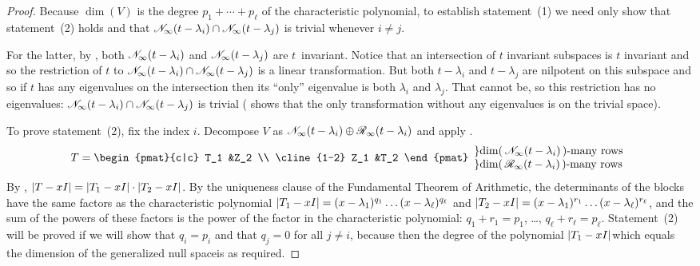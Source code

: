 \begin{proof}
Because \( \dim (V) \) is the degree \( p_1+\cdots+p_\ell \) of the
characteristic polynomial, to establish statement~(1) we need only show that 
statement~(2) holds and that
\( \mathscr{N}_\infty(t-\lambda_i)\cap\mathscr{N}_\infty(t-\lambda_j) \)
is trivial whenever \( i\neq j \).

For the latter, by ,
both \( \mathscr{N}_\infty(t-\lambda_i) \) and 
\( \mathscr{N}_\infty(t-\lambda_j) \) are \( t \)~invariant.
Notice that an intersection of \( t \) invariant subspaces is \( t \)
invariant and so the restriction of \( t \) to
\( \mathscr{N}_\infty(t-\lambda_i)\cap\mathscr{N}_\infty(t-\lambda_j) \)
is a linear transformation.
But both \( t-\lambda_i \) and \( t-\lambda_j \) are nilpotent on this subspace
and so if \( t \) has any eigenvalues on the intersection 
then its ``only'' eigenvalue is both
\( \lambda_i \) and \( \lambda_j \).
That cannot be, so this restriction has no eigenvalues:
\( \mathscr{N}_\infty(t-\lambda_i)\cap\mathscr{N}_\infty(t-\lambda_j) \)
is trivial
( shows that 
the only transformation without any eigenvalues is on the trivial space).

To prove statement~(2), fix the index \( i \).
Decompose \( V \) as 
\( \mathscr{N}_\infty(t-\lambda_i)\oplus\mathscr{R}_\infty(t-\lambda_i) \)
and apply .
\begin{equation*}
  T=
  \begin{pmat}{c|c}
      T_1   &Z_2  \\  \cline{1-2}
      Z_1   &T_2
   \end{pmat}
   \begin{array}{ll}
     \} \text{$\dim(\,\gennullspace{t-\lambda_i}\,)$-many rows}  \\
     \} \text{$\dim(\,\genrangespace{t-\lambda_i}\,)$-many rows}
   \end{array}
\end{equation*}
By ,
\( \deter{T-xI}=\deter{T_1-xI}\cdot\deter{T_2-xI} \).
By the uniqueness clause of the Fundamental Theorem of Arithmetic,
the determinants of the blocks have the same factors as the
characteristic polynomial
\( \deter{T_1-xI}=(x-\lambda_1)^{q_1}\dots(x-\lambda_\ell)^{q_\ell} \)
and
\( \deter{T_2-xI}=(x-\lambda_1)^{r_1}\dots(x-\lambda_\ell)^{r_\ell} \),
and the sum of the powers of these factors is the power of the factor
in the characteristic polynomial:
\( q_1+r_1=p_1 \), \dots, \( q_\ell+r_\ell=p_\ell \).
Statement~(2) will be proved if we will show that $q_i=p_i$ and that
$q_j=0$ for all $j\neq i$, because then the degree of 
the polynomial $\deter{T_1-xI}$\Dash which equals the dimension of the
generalized null space\Dash is as required.


\end{proof}
